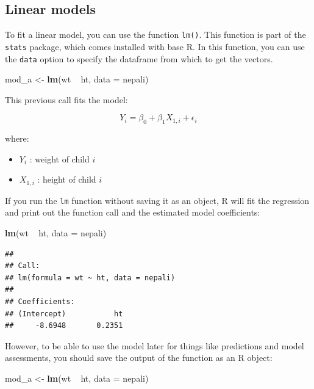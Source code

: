 \documentclass[]{book}
\makeatletter
\newenvironment{Shaded}{\begin{snugshade}}{\end{snugshade}}
\newcommand{\KeywordTok}[1]{\textcolor[rgb]{0.13,0.29,0.53}{\textbf{{#1}}}}
\newcommand{\DataTypeTok}[1]{\textcolor[rgb]{0.13,0.29,0.53}{{#1}}}
\newcommand{\StringTok}[1]{\textcolor[rgb]{0.31,0.60,0.02}{{#1}}}
\newcommand{\NormalTok}[1]{{#1}}
\providecommand{\tightlist}{%
  \setlength{\itemsep}{0pt}\setlength{\parskip}{0pt}}
\newenvironment{kframe}{%
\medskip{}
\setlength{\fboxsep}{.8em}
 \def\at@end@of@kframe{}%
 \ifinner\ifhmode%
  \def\at@end@of@kframe{\end{minipage}}%
  \begin{minipage}{\columnwidth}%
 \fi\fi%
 \def\FrameCommand##1{\hskip\@totalleftmargin \hskip-\fboxsep
 \colorbox{shadecolor}{##1}\hskip-\fboxsep
     \hskip-\linewidth \hskip-\@totalleftmargin \hskip\columnwidth}%
 \MakeFramed {\advance\hsize-\width
   \@totalleftmargin\z@ \linewidth\hsize
   \@setminipage}}%
 {\par\unskip\endMakeFramed%
 \at@end@of@kframe}
\renewenvironment{Shaded}{\begin{kframe}}{\end{kframe}}
\makeatother
\begin{document}
\subsection{Linear models}\label{linear-models}

To fit a linear model, you can use the function \texttt{lm()}. This
function is part of the \texttt{stats} package, which comes installed
with base R. In this function, you can use the \texttt{data} option to
specify the dataframe from which to get the vectors.

\begin{Shaded}
\begin{Highlighting}[]
\NormalTok{mod_a <-}\StringTok{ }\KeywordTok{lm}\NormalTok{(wt ~}\StringTok{ }\NormalTok{ht, }\DataTypeTok{data =} \NormalTok{nepali)}
\end{Highlighting}
\end{Shaded}

This previous call fits the model:

\[ Y_{i} = \beta_{0} + \beta_{1}X_{1,i} + \epsilon_{i} \]

where:

\begin{itemize}
\tightlist
\item
  \(Y_{i}\) : weight of child \(i\)
\item
  \(X_{1,i}\) : height of child \(i\)
\end{itemize}

If you run the \texttt{lm} function without saving it as an object, R
will fit the regression and print out the function call and the
estimated model coefficients:

\begin{Shaded}
\begin{Highlighting}[]
\KeywordTok{lm}\NormalTok{(wt ~}\StringTok{ }\NormalTok{ht, }\DataTypeTok{data =} \NormalTok{nepali)}
\end{Highlighting}
\end{Shaded}

\begin{verbatim}
## 
## Call:
## lm(formula = wt ~ ht, data = nepali)
## 
## Coefficients:
## (Intercept)           ht  
##     -8.6948       0.2351
\end{verbatim}

However, to be able to use the model later for things like predictions
and model assessments, you should save the output of the function as an
R object:

\begin{Shaded}
\begin{Highlighting}[]
\NormalTok{mod_a <-}\StringTok{ }\KeywordTok{lm}\NormalTok{(wt ~}\StringTok{ }\NormalTok{ht, }\DataTypeTok{data =} \NormalTok{nepali)}
\end{Highlighting}
\end{Shaded}
\end{document}
